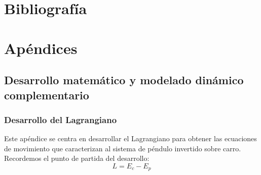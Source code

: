 \documentclass[11pt,fleqn]{book} %
\begin{document}
%


\chapter*{Bibliografía}

\printbibliography[heading=bibempty]






\chapter{Apéndices}
\label{chap:apendices}

\setcounter{section}{0} %
\renewcommand{\thesection}{\Alph{section}} %

\section{Desarrollo matemático y modelado dinámico complementario}
\subsection{Desarrollo del Lagrangiano}
\label{anexo:desarrollo_dinamico}

Este apéndice se centra en desarrollar el Lagrangiano para obtener las ecuaciones de movimiento que caracterizan al sistema de péndulo invertido sobre carro. Recordemos el punto de partida del desarrollo:
\begin{equation}
	L = E_c - E_p
	\label{eq:lagrangiano_ap}
\end{equation}
\end{document}
